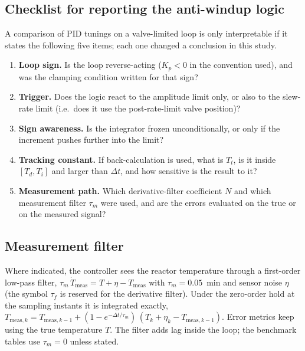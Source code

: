 \subsection{Checklist for reporting the anti-windup logic}
\label{subsec:checklist}
A comparison of PID tunings on a valve-limited loop is only interpretable if it states the following five items; each one changed a conclusion in this study.
\begin{enumerate}
    \item \textbf{Loop sign.} Is the loop reverse-acting ($K_p<0$ in the convention used), and was the clamping condition written for that sign?
    \item \textbf{Trigger.} Does the logic react to the amplitude limit only, or also to the slew-rate limit (i.e.\ does it use the post-rate-limit valve position)?
    \item \textbf{Sign awareness.} Is the integrator frozen unconditionally, or only if the increment pushes further into the limit?
    \item \textbf{Tracking constant.} If back-calculation is used, what is $T_t$, is it inside $[T_d, T_i]$ and larger than $\Delta t$, and how sensitive is the result to it?
    \item \textbf{Measurement path.} Which derivative-filter coefficient $N$ and which measurement filter $\tau_m$ were used, and are the errors evaluated on the true or on the measured signal?
\end{enumerate}

\subsection{Measurement filter}
\label{subsec:meas_filter}
Where indicated, the controller sees the reactor temperature through a first-order low-pass filter, $\tau_m\,\dot T_{\text{meas}} = T + \eta - T_{\text{meas}}$ with $\tau_m = 0.05$~min and sensor noise $\eta$ (the symbol $\tau_f$ is reserved for the derivative filter). Under the zero-order hold at the sampling instants it is integrated exactly, $T_{\text{meas},k} = T_{\text{meas},k-1} + (1 - e^{-\Delta t/\tau_m})\,(T_k + \eta_k - T_{\text{meas},k-1})$. Error metrics keep using the true temperature $T$. The filter adds lag inside the loop; the benchmark tables use $\tau_m = 0$ unless stated.

